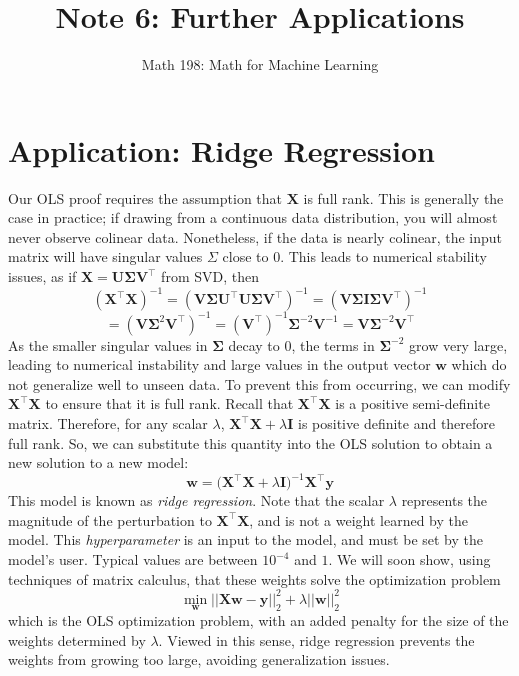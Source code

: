 \documentclass{article}
\title{Note 6: Further Applications}
\author{Math 198: Math for Machine Learning}
\date{}
\begin{document}
\maketitle

\section*{Application: Ridge Regression}
Our OLS proof requires the assumption that $\mathbf{X}$ is full rank. This is generally the case in practice; if drawing from a continuous data distribution, you will almost never observe colinear data. Nonetheless, if the data is nearly colinear, the input matrix will have singular values $\Sigma$ close to 0. This leads to numerical stability issues, as if $\mathbf{X = U\Sigma V^{\top}}$ from SVD, then $$(\mathbf{X^{\top}X})^{-1} = (\mathbf{V\Sigma U^{\top}U\Sigma V^{\top}})^{-1} = (\mathbf{V\Sigma I\Sigma V^{\top}})^{-1}$$ $$= (\mathbf{V\Sigma}^2\mathbf{V^{\top}})^{-1} = (\mathbf{V^{\top}})^{-1}\mathbf{\Sigma}^{-2}\mathbf{V}^{-1} = \mathbf{V\Sigma}^{-2}\mathbf{V}^{\top}$$ As the smaller singular values in $\mathbf{\Sigma}$ decay to 0, the terms in $\mathbf{\Sigma}^{-2}$ grow very large, leading to numerical instability and large values in the output vector $\mathbf{w}$ which do not generalize well to unseen data. To prevent this from occurring, we can modify $\mathbf{X^{\top}X}$ to ensure that it is full rank. Recall that $\mathbf{X^{\top}X}$ is a positive semi-definite matrix. Therefore, for any scalar $\lambda$, $\mathbf{X^{\top}X} + \lambda\mathbf{I}$ is positive definite and therefore full rank. So, we can substitute this quantity into the OLS solution to obtain a new solution to a new model: $$\mathbf{w} = \mathbf{(X^{\top}X} + \lambda\mathbf{I})^{-1}\mathbf{X^{\top}y}$$ This model is known as \textit{ridge regression}. Note that the scalar $\lambda$ represents the magnitude of the perturbation to $\mathbf{X^{\top}X}$, and is not a weight learned by the model. This \textit{hyperparameter} is an input to the model, and must be set by the model's user. Typical values are between $10^{-4}$ and $1$. We will soon show, using techniques of matrix calculus, that these weights solve the optimization problem $$\min\limits_{\mathbf{w}} ||\mathbf{Xw - y}||_2^2 + \lambda ||\mathbf{w}||_2^2$$ which is the OLS optimization problem, with an added penalty for the size of the weights determined by $\lambda$. Viewed in this sense, ridge regression prevents the weights from growing too large, avoiding generalization issues.
\end{document}
